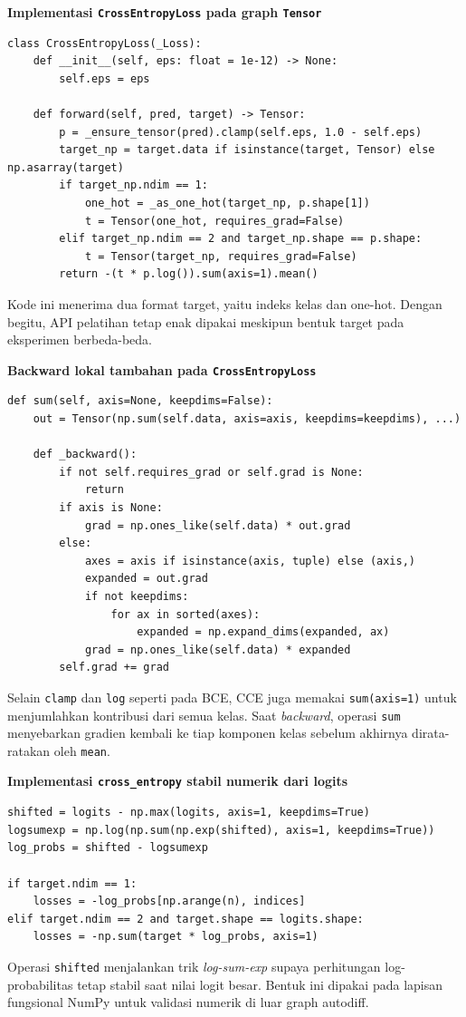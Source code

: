 \documentclass{article}
\begin{document}
\noindent\textbf{Implementasi \texttt{CrossEntropyLoss} pada graph \texttt{Tensor}}\par
\begin{lstlisting}
class CrossEntropyLoss(_Loss):
    def __init__(self, eps: float = 1e-12) -> None:
        self.eps = eps

    def forward(self, pred, target) -> Tensor:
        p = _ensure_tensor(pred).clamp(self.eps, 1.0 - self.eps)
        target_np = target.data if isinstance(target, Tensor) else np.asarray(target)
        if target_np.ndim == 1:
            one_hot = _as_one_hot(target_np, p.shape[1])
            t = Tensor(one_hot, requires_grad=False)
        elif target_np.ndim == 2 and target_np.shape == p.shape:
            t = Tensor(target_np, requires_grad=False)
        return -(t * p.log()).sum(axis=1).mean()
\end{lstlisting}
Kode ini menerima dua format target, yaitu indeks kelas dan one-hot. Dengan begitu, API pelatihan tetap enak dipakai meskipun bentuk target pada eksperimen berbeda-beda.

\noindent\textbf{Backward lokal tambahan pada \texttt{CrossEntropyLoss}}\par
\begin{lstlisting}
def sum(self, axis=None, keepdims=False):
    out = Tensor(np.sum(self.data, axis=axis, keepdims=keepdims), ...)

    def _backward():
        if not self.requires_grad or self.grad is None:
            return
        if axis is None:
            grad = np.ones_like(self.data) * out.grad
        else:
            axes = axis if isinstance(axis, tuple) else (axis,)
            expanded = out.grad
            if not keepdims:
                for ax in sorted(axes):
                    expanded = np.expand_dims(expanded, ax)
            grad = np.ones_like(self.data) * expanded
        self.grad += grad
\end{lstlisting}
Selain \texttt{clamp} dan \texttt{log} seperti pada BCE, CCE juga memakai \texttt{sum(axis=1)} untuk menjumlahkan kontribusi dari semua kelas. Saat \textit{backward}, operasi \texttt{sum} menyebarkan gradien kembali ke tiap komponen kelas sebelum akhirnya dirata-ratakan oleh \texttt{mean}.

\noindent\textbf{Implementasi \texttt{cross\_entropy} stabil numerik dari logits}\par
\begin{lstlisting}
shifted = logits - np.max(logits, axis=1, keepdims=True)
logsumexp = np.log(np.sum(np.exp(shifted), axis=1, keepdims=True))
log_probs = shifted - logsumexp

if target.ndim == 1:
    losses = -log_probs[np.arange(n), indices]
elif target.ndim == 2 and target.shape == logits.shape:
    losses = -np.sum(target * log_probs, axis=1)
\end{lstlisting}
Operasi \texttt{shifted} menjalankan trik \textit{log-sum-exp} supaya perhitungan log-probabilitas tetap stabil saat nilai logit besar. Bentuk ini dipakai pada lapisan fungsional NumPy untuk validasi numerik di luar graph autodiff.
\end{document}
